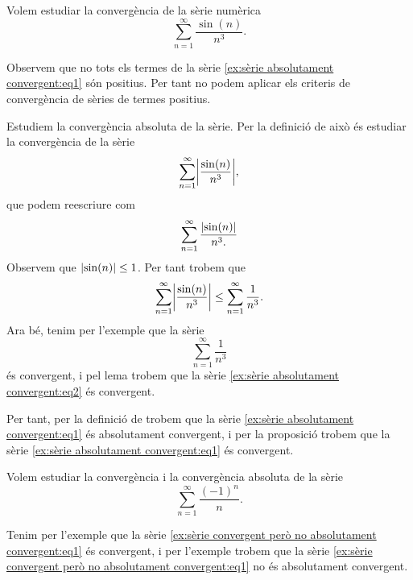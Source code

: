 \documentclass[../../Main.tex]{subfiles}
\begin{document}
	\begin{example}
		\label{ex:sèrie absolutament convergent}
		Volem estudiar la convergència de la sèrie numèrica
		\begin{equation}
			\label{ex:sèrie absolutament convergent:eq1}
			\sum_{n=1}^{\infty}\frac{\sin(n)}{n^{3}}.
		\end{equation}
		\begin{solution}
			Observem que no tots els termes de la sèrie \eqref{ex:sèrie absolutament convergent:eq1} són positius. Per tant no podem aplicar els criteris de convergència de sèries de termes positius.
			
			Estudiem la convergència absoluta de la sèrie. Per la definició de  això és estudiar la convergència de la sèrie
			\begin{equation}
				\label{ex:sèrie absolutament convergent:eq2}
				\sum_{n=1}^{\infty}\abs{\frac{\sin(n)}{n^{3}}},
			\end{equation}
			que podem reescriure com
			\[\sum_{n=1}^{\infty}\frac{\abs{\sin(n)}}{n^{3}.}\]
			Observem que \(\abs{\sin(n)}\leq1\). Per tant trobem que
			\[\sum_{n=1}^{\infty}\abs{\frac{\sin(n)}{n^{3}}}\leq\sum_{n=1}^{\infty}\frac{1}{n^{3}}.\]
			Ara bé, tenim per l'exemple  que la sèrie
			\[\sum_{n=1}^{\infty}\frac{1}{n^{3}}\]
			és convergent, i pel lema  trobem que la sèrie \eqref{ex:sèrie absolutament convergent:eq2} és convergent.
			
			Per tant, per la definició de  trobem que la sèrie \eqref{ex:sèrie absolutament convergent:eq1} és absolutament convergent, i per la proposició  trobem que la sèrie \eqref{ex:sèrie absolutament convergent:eq1} és convergent.
		\end{solution}
	\end{example}
	\begin{example} %
		\label{ex:sèrie convergent però no absolutament convergent}
		Volem estudiar la convergència i la convergència absoluta de la sèrie
		\begin{equation}
			\label{ex:sèrie convergent però no absolutament convergent:eq1}
			\sum_{n=1}^{\infty}\frac{(-1)^{n}}{n}.
		\end{equation}
		\begin{solution}
			Tenim per l'exemple  que la sèrie \eqref{ex:sèrie convergent però no absolutament convergent:eq1} és convergent, i per l'exemple  trobem que la sèrie \eqref{ex:sèrie convergent però no absolutament convergent:eq1} no és absolutament convergent.
		\end{solution}
	\end{example}
\end{document}
